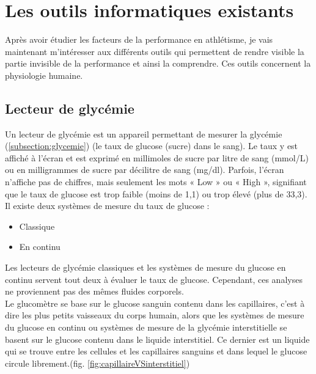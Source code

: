 \chapter{Les outils informatiques existants}
\label{part:outils}

Après avoir étudier les facteurs de la performance en athlétisme, je vais maintenant m'intéresser aux différents outils qui permettent de rendre visible la partie invisible de la performance et ainsi la comprendre. Ces outils concernent la physiologie humaine.

    \section{Lecteur de glycémie}
    
    Un lecteur de glycémie est un appareil permettant de mesurer la glycémie (\autoref{subsection:glycemie}) (le taux de glucose (sucre) dans le sang). Le taux y est affiché à l’écran et est exprimé en millimoles de sucre par litre de sang (mmol/L) ou en milligrammes de sucre par décilitre de sang (mg/dl).
    Parfois, l’écran n’affiche pas de chiffres, mais seulement les mots « Low » ou « High », signifiant que le taux de glucose est trop faible (moins de 1,1) ou trop élevé (plus de 33,3).\\
    
    Il existe deux systèmes de mesure du taux de glucose : 
    \begin{itemize}
        \item Classique
        \item En continu\\
    \end{itemize}
    
    Les lecteurs de glycémie classiques et les systèmes de mesure du glucose en continu servent tout deux à évaluer le taux de glucose. Cependant, ces analyses ne proviennent pas des mêmes fluides corporels.\\
    
    Le glucomètre se base sur le glucose sanguin contenu dans les capillaires, c'est à dire les plus petits vaisseaux du corps humain, alors que les systèmes de mesure du glucose en continu ou systèmes de mesure de la glycémie interstitielle se basent sur le glucose contenu dans le liquide interstitiel. Ce dernier est un liquide qui se trouve entre les cellules et les capillaires sanguins et dans lequel le glucose circule librement.(fig. \ref{fig:capillaireVSinterstitiel})
    
